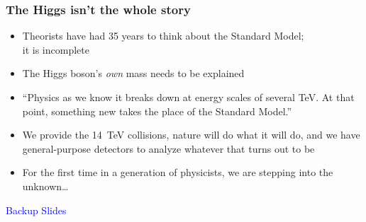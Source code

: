 \documentclass[compress]{beamer}
\begin{document}
\begin{frame}
\frametitle{The Higgs isn't the whole story}
\begin{itemize}\setlength{\itemsep}{0.5 cm}
\item Theorists have had 35 years to think about the Standard Model; \\
  it is incomplete

\item The Higgs boson's {\it own} mass needs to be explained

\item ``Physics as we know it breaks down at energy scales of several
  TeV.  At that point, something new takes the place of the Standard
  Model.''

\item We provide the 14~TeV collisions, nature will do what it will
  do, and we have general-purpose detectors to analyze whatever that
  turns out to be

\item For the first time in a generation of physicists, we are
  stepping into the unknown\ldots

\end{itemize}
\label{numpages}
\end{frame}



\begin{frame}
\begin{center}
\Huge \textcolor{blue}{Backup Slides}
\end{center}
\end{frame}
\end{document}

